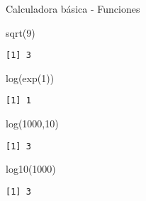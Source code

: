 \documentclass[
  ignorenonframetext,
]{beamer}
\newenvironment{Shaded}{\begin{snugshade}}{\end{snugshade}}
\newcommand{\DecValTok}[1]{\textcolor[rgb]{0.00,0.00,0.81}{#1}}
\newcommand{\FunctionTok}[1]{\textcolor[rgb]{0.00,0.00,0.00}{#1}}
\newcommand{\NormalTok}[1]{#1}
\begin{document}
\begin{frame}[fragile]{Calculadora básica - Funciones}
\protect\hypertarget{calculadora-buxe1sica---funciones-1}{}
\begin{Shaded}
\begin{Highlighting}[]
\FunctionTok{sqrt}\NormalTok{(}\DecValTok{9}\NormalTok{)}
\end{Highlighting}
\end{Shaded}

\begin{verbatim}
[1] 3
\end{verbatim}

\begin{Shaded}
\begin{Highlighting}[]
\FunctionTok{log}\NormalTok{(}\FunctionTok{exp}\NormalTok{(}\DecValTok{1}\NormalTok{))}
\end{Highlighting}
\end{Shaded}

\begin{verbatim}
[1] 1
\end{verbatim}

\begin{Shaded}
\begin{Highlighting}[]
\FunctionTok{log}\NormalTok{(}\DecValTok{1000}\NormalTok{,}\DecValTok{10}\NormalTok{)}
\end{Highlighting}
\end{Shaded}

\begin{verbatim}
[1] 3
\end{verbatim}

\begin{Shaded}
\begin{Highlighting}[]
\FunctionTok{log10}\NormalTok{(}\DecValTok{1000}\NormalTok{)}
\end{Highlighting}
\end{Shaded}

\begin{verbatim}
[1] 3
\end{verbatim}
\end{frame}
\end{document}
